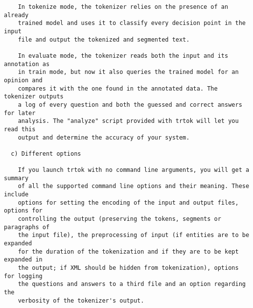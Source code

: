 \begin{small}
\begin{verbatim}
    In tokenize mode, the tokenizer relies on the presence of an already
    trained model and uses it to classify every decision point in the input
    file and output the tokenized and segmented text.

    In evaluate mode, the tokenizer reads both the input and its annotation as
    in train mode, but now it also queries the trained model for an opinion and
    compares it with the one found in the annotated data. The tokenizer outputs
    a log of every question and both the guessed and correct answers for later
    analysis. The "analyze" script provided with trtok will let you read this
    output and determine the accuracy of your system.

  c) Different options

    If you launch trtok with no command line arguments, you will get a summary
    of all the supported command line options and their meaning. These include
    options for setting the encoding of the input and output files, options for
    controlling the output (preserving the tokens, segments or paragraphs of
    the input file), the preprocessing of input (if entities are to be expanded
    for the duration of the tokenization and if they are to be kept expanded in
    the output; if XML should be hidden from tokenization), options for logging
    the questions and answers to a third file and an option regarding the
    verbosity of the tokenizer's output.
\end{verbatim}
\end{small}
